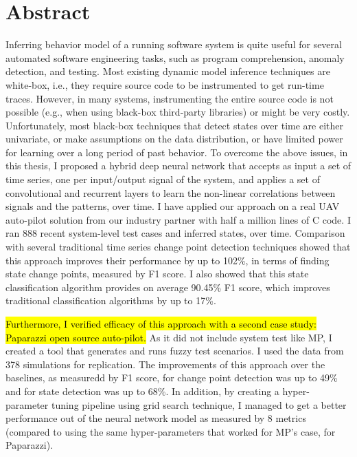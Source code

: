 
\chapter{Abstract}
Inferring behavior model of a running software system is quite useful for several automated software engineering tasks, such as program comprehension, anomaly detection, and testing. Most existing dynamic model inference techniques are white-box, i.e., they require source code to be instrumented to get run-time traces. However, in many systems, instrumenting the entire source code is not possible (e.g., when using black-box third-party libraries) or might be very costly. %
Unfortunately, most black-box techniques that detect states over time are either univariate, or make assumptions on the data distribution, or have limited power for learning over a long period of past behavior. 
To overcome the above issues, in this thesis, I proposed a hybrid deep neural network that accepts as input a set of time series, one per input/output signal of the system, and applies a set of convolutional and recurrent layers to learn the non-linear correlations between signals and the patterns, over time. 
I have applied our approach on a real UAV auto-pilot solution from our industry partner with half a million lines of C code. 
I ran 888 recent system-level test cases and inferred states, over time. 
Comparison with several traditional time series change point detection techniques showed that this approach improves their performance by up to 102\%, in terms of finding state change points, measured by F1 score. I also showed that this state classification algorithm provides on average 90.45\% F1 score, which improves traditional classification algorithms by up to 17\%.

\hl{Furthermore, I verified efficacy of this approach with a second case study: Paparazzi open source auto-pilot.} As it did not include system test like MP, I created a tool that generates and runs fuzzy test scenarios. I used the data from 378 simulations for replication. The improvements of this approach over the baselines, as measuredd by F1 score, for change point detection was up to 49\% and for state detection was up to 68\%.
In addition, by creating a hyper-parameter tuning pipeline using grid search technique, I managed to get a better performance out of the neural network model as measured by 8 metrics (compared to using the same hyper-parameters that worked for MP's case, for Paparazzi).%

